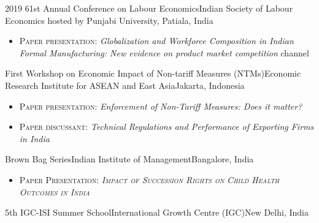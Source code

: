 %
%
%


\begin{conference}

  \experience
    {2019}   {61st Annual Conference on Labour Economics}{Indian Society of Labour Economics}{ hosted by Punjabi University, Patiala, India}
    {} {
                      \begin{itemize}
                        \item \textsc{Paper presentation:} \textit{Globalization and Workforce Composition in Indian Formal Manufacturing:  New evidence on product market competition} channel  \vspace{10pt}
                      \end{itemize}
                    }
  \experience
    {}   {First Workshop on Economic Impact of Non-tariff Measures (NTMs)}{Economic Research Institute for ASEAN and East Asia}{Jakarta, Indonesia}
    {} {
                      \begin{itemize}
                        \item \textsc{Paper presentation:} \textit{Enforcement of Non-Tariff Measures: Does it matter?}
                        \item \textsc{Paper discussant:} \textit{Technical Regulations and Performance of Exporting Firms in India \vspace{10pt}}
                      \end{itemize}
                    }
\emptySeparator
  \experience
    {}   {Brown Bag Series}{Indian Institute of Management}{Bangalore, India}
    {} {
                      \begin{itemize}
                        \item \textsc{Paper Presentation: \textit{Impact of Succession Rights on Child Health Outcomes in India} \vspace{10pt}}             
                      \end{itemize}
                    }
  \experience
    {}   {5th IGC-ISI Summer School}{International Growth Centre (IGC)}{New Delhi, India}
    {} {
                      \begin{itemize}

\end{itemize}}
\end{conference}
